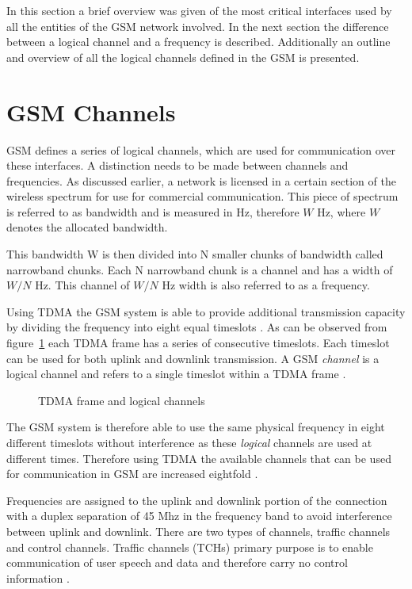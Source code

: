 In this section a brief overview was given of the most critical interfaces used by all the entities of the GSM network involved. In the next section the difference between a logical channel and a frequency is described. Additionally an outline and overview of all the logical channels defined in the GSM is presented. 
\section{GSM Channels}
\label{sec:interfacech}
GSM defines a series of logical channels, which are used for communication over these interfaces. A distinction needs to be made between channels and frequencies. As discussed earlier, a network is licensed in a certain section of the wireless spectrum for use for commercial communication. This piece of spectrum is referred to as bandwidth and is measured in Hz, therefore $W$ Hz, where $W$ denotes the allocated bandwidth\cite{FundamentalsWirelessCommunication}.

This bandwidth W is then divided into N smaller chunks of bandwidth called narrowband chunks. Each N narrowband chunk is a channel and has a width of $W/N$ Hz\cite{FundamentalsWirelessCommunication}. This channel of $W/N$ Hz width is also referred to as a frequency.\label{def:channel}

Using TDMA the GSM system is able to provide additional transmission capacity by dividing the frequency into eight equal timeslots \cite{wirelesstelcoMullet}. 
As can be observed from figure~\ref{fig:GSMChannels} each TDMA frame has a series of consecutive timeslots. Each timeslot can be used for both uplink and downlink transmission. A GSM \emph{channel} is a logical channel and refers to a single timeslot within a TDMA frame \cite{wirelesstelcoMullet,GSMArchitectureProtocolsServices}.
\begin{figure}[H]
	\begin{centering}
		
		\caption{TDMA frame and logical channels \cite{wirelesstelcoMullet}}
		\label{fig:GSMChannels}
	\end{centering}
\end{figure}
The GSM system is therefore able to use the same physical frequency in eight different timeslots without interference as these \emph{logical} channels are used at different times. Therefore using TDMA the available channels that can be used for communication in GSM are increased eightfold \cite{wirelesstelcoMullet}.

Frequencies are assigned to the uplink and downlink portion of the connection with a duplex separation of 45 Mhz in the frequency band to avoid interference between uplink and downlink. There are two types of channels, traffic channels and control channels. Traffic channels (TCHs) primary purpose is to enable communication of user speech and data and therefore carry no control information \cite{GSMArchitectureProtocolsServices}.

